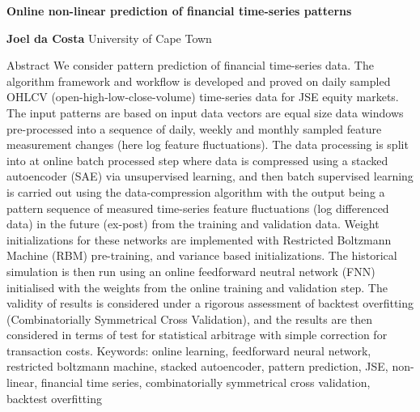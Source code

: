 \documentclass[a4paper,latin]{paper}
\begin{document}
 
	\sectionfont{\large\sf\bfseries\color{black!70!blue}} 


\begin{titlepage}
	\begin{center}
		\vspace*{1cm}

		\Huge
		\textbf{Online non-linear prediction of financial time-series patterns}
		\vspace{0.5cm}
		\LARGE
		
		\vspace{1.5cm}
		
		\textbf{Joel da Costa}
		\vfill
		\vspace{0.8cm}
		\Large
		University of Cape Town\\
		
	\end{center}
\end{titlepage}
\newpage
\vspace{0.5cm}
\LARGE
Abstract
\normalsize
\newline\newline
We consider pattern prediction of financial time-series data. The algorithm framework and workflow is developed and proved on daily sampled OHLCV (open-high-low-close-volume) time-series data for JSE equity markets. The input patterns are based on input data vectors are equal size data windows pre-processed into a sequence of daily, weekly and monthly sampled feature measurement changes (here log feature fluctuations). The data processing is split into at online batch processed step where data is compressed using a stacked autoencoder (SAE) via unsupervised learning, and then batch supervised learning is carried out using the data-compression algorithm with the output being a pattern sequence of measured time-series feature fluctuations (log differenced data) in the future (ex-post) from the training and validation data. Weight initializations for these networks are implemented with Restricted Boltzmann Machine (RBM) pre-training, and variance based initializations. The historical simulation is then run using an online feedforward neutral network (FNN) initialised with the weights from the online training and validation step. The validity of results is considered under a rigorous assessment of backtest overfitting (Combinatorially Symmetrical Cross Validation), and the results are then considered in terms of test for statistical arbitrage with simple correction for transaction costs.
\newline\newline
Keywords: online learning, feedforward neural network, restricted boltzmann machine, stacked autoencoder, pattern prediction, JSE, non-linear, financial time series, combinatorially symmetrical cross validation, backtest overfitting
\newpage
\tableofcontents
\newpage
\listoffigures
\newpage
\listoftables
\newpage
\end{document}
